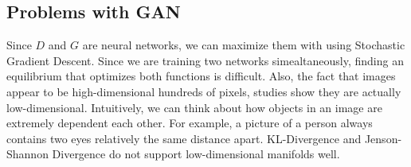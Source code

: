 \subsection{Problems with GAN}
Since $D$ and $G$ are neural networks, we can maximize them with using Stochastic Gradient Descent. Since we are training two networks simealtaneously, finding an equilibrium that optimizes both functions is difficult. Also, the fact that images appear to be high-dimensional hundreds of pixels, studies show they are actually low-dimensional. Intuitively, we can think about how objects in an image are extremely dependent each other. For example, a picture of a person always contains two eyes relatively the same distance apart. KL-Divergence and Jenson-Shannon Divergence do not support low-dimensional manifolds well. 